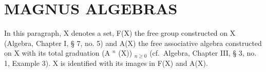 \section{MAGNUS ALGEBRAS}

In this paragraph, X denotes a set, F(X) the free group constructed on X (Algebra, Chapter I, § 7, no. 5) and A(X) the free associative algebra constructed on X with its total graduation (A \(^{n}\) (X)) \(_{n\geqslant0}\) (cf.~Algebra, Chapter III, § 3, no. 1, Example 3). X is identified with its images in F(X) and A(X).

